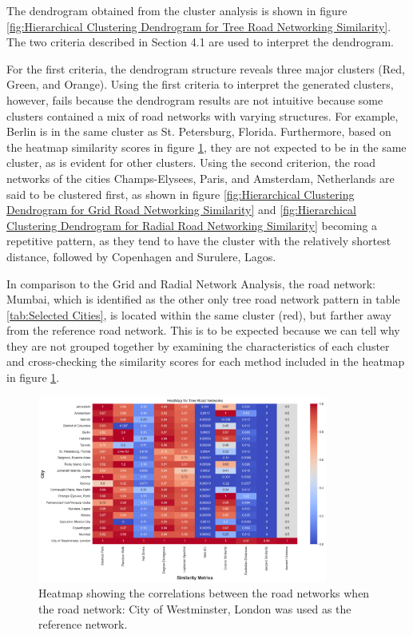 The dendrogram obtained from the cluster analysis is shown in figure \ref{fig:Hierarchical Clustering Dendrogram for Tree Road Networking Similarity}. The two criteria described in Section 4.1 are used to interpret the dendrogram.

For the first criteria, the dendrogram structure reveals three major clusters (Red, Green, and Orange). Using the first criteria to interpret the generated clusters, however, fails because the dendrogram results are not intuitive because some clusters contained a mix of road networks with varying structures. For example, Berlin is in the same cluster as St. Petersburg, Florida. Furthermore, based on the heatmap similarity scores in figure \ref{fig:Heatmap showing the correlations for Tree Road Networks}, they are not expected to be in the same cluster, as is evident for other clusters. Using the second criterion, the road networks of the cities Champs-Elysees, Paris, and Amsterdam, Netherlands are said to be clustered first, as shown in figure \ref{fig:Hierarchical Clustering Dendrogram for Grid Road Networking Similarity} and \ref{fig:Hierarchical Clustering Dendrogram for Radial Road Networking Similarity} becoming a repetitive pattern, as they tend to have the cluster with the relatively shortest distance, followed by Copenhagen and Surulere, Lagos.

In comparison to the Grid and Radial Network Analysis, the road network: Mumbai, which is identified as the other only tree road network pattern in table \ref{tab:Selected Cities}, is located within the same cluster (red), but farther away from the reference road network. This is to be expected because we can tell why they are not grouped together by examining the characteristics of each cluster and cross-checking the similarity scores for each method included in the heatmap in figure \ref{fig:Heatmap showing the correlations for Tree Road Networks}.

\begin{figure}[!ht]
\centering
\includegraphics[width=0.85\textwidth,center]{picture/Tree/treeheatmap.png}
\caption[Heatmap showing the correlations for Tree Road Networks]{Heatmap showing the correlations between the road networks when the road network: City of Westminster, London was used as the reference network.}
\label{fig:Heatmap showing the correlations for Tree Road Networks}
\end{figure}

